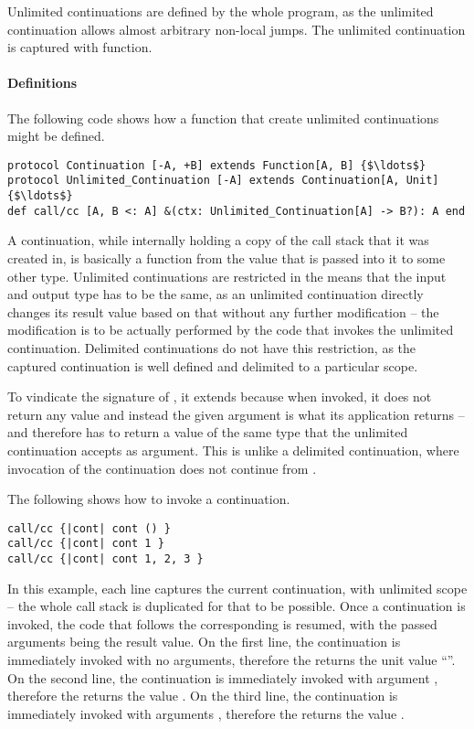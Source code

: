 Unlimited continuations are defined by the whole program, as the unlimited continuation allows almost arbitrary non-local jumps. The unlimited continuation is captured with  function. 

\paragraph{Definitions}
The following code shows how a function that create unlimited continuations might be defined. 
\begin{lstlisting}
protocol Continuation [-A, +B] extends Function[A, B] {$\ldots$}
protocol Unlimited_Continuation [-A] extends Continuation[A, Unit] {$\ldots$}
def call/cc [A, B <: A] &(ctx: Unlimited_Continuation[A] -> B?): A end
\end{lstlisting}

A continuation, while internally holding a copy of the call stack that it was created in, is basically a function from the value that is passed into it to some other type. Unlimited continuations are restricted in the means that the input and output type has to be the same, as an unlimited continuation directly changes its result value based on that without any further modification -- the modification is to be actually performed by the code that invokes the unlimited continuation. Delimited continuations do not have this restriction, as the captured continuation is well defined and delimited to a particular scope. 

To vindicate the signature of , it extends  because when invoked, it does not return any value and instead the given argument is what its  application returns -- and therefore  has to return a value of the same type that the unlimited continuation accepts as argument. This is unlike a delimited continuation, where invocation of the continuation does not continue from . 

\example The following shows how to invoke a continuation. 
\begin{lstlisting}
call/cc {|cont| cont () }
call/cc {|cont| cont 1 }
call/cc {|cont| cont 1, 2, 3 }
\end{lstlisting}
In this example, each line captures the current continuation, with unlimited scope -- the whole call stack is duplicated for that to be possible. Once a continuation is invoked, the code that follows the corresponding  is resumed, with the passed arguments being the result value. On the first line, the continuation is immediately invoked with no arguments, therefore the  returns the unit value ``\code{()}''. On the second line, the continuation is immediately invoked with argument , therefore the  returns the value . On the third line, the continuation is immediately invoked with arguments , therefore the  returns the value . 

